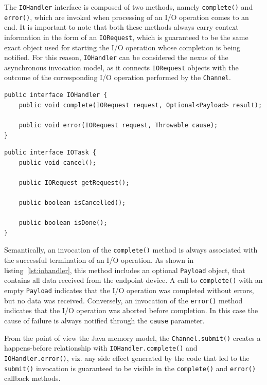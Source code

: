 The \texttt{IOHandler} interface is composed of two methods, namely
\texttt{complete()} and \texttt{error()}, which are invoked when processing of
an I/O operation comes to an end. It is important to note that both these
methods always carry context information in the form of an \texttt{IORequest},
which is guaranteed to be the same exact object used for starting the I/O
operation whose completion is being notified. For this reason,
\texttt{IOHandler} can be considered the nexus of the asynchronous invocation
model, as it connects \texttt{IORequest} objects with the outcome of the
corresponding I/O operation performed by the \texttt{Channel}.

\lstset{language=Java}
\begin{lstlisting}[float,floatplacement=H,caption=The IOHandler
interface,label={lst:iohandler}]
public interface IOHandler {
	public void complete(IORequest request, Optional<Payload> result);
	
	public void error(IORequest request, Throwable cause);
}
\end{lstlisting}

\lstset{language=Java}
\begin{lstlisting}[float,floatplacement=!hbt,caption=The IOTask
interface,label={lst:iotask}]
public interface IOTask {
	public void cancel();
	
	public IORequest getRequest();
	
	public boolean isCancelled();
	
	public boolean isDone();
}
\end{lstlisting}

Semantically, an invocation of the \texttt{complete()} method is always
associated with the successful termination of an I/O operation. As shown in
listing~\ref{lst:iohandler}, this method includes an optional \texttt{Payload}
object, that contains all data received from the endpoint device. A call to
\texttt{complete()} with an empty \texttt{Payload} indicates that the I/O
operation was completed without errors, but no data was received. Conversely,
an invocation of the \texttt{error()} method indicates that the I/O operation
was aborted before completion. In this case the cause of failure is always
notified through the \texttt{cause} parameter.

From the point of view the Java memory model, the \texttt{Channel.submit()}
creates a happens-before relationship with \texttt{IOHandler.complete()} and
\texttt{IOHandler.error()}, viz. any side effect generated by the code that led
to the \texttt{submit()} invocation is guaranteed to be visible in the
\texttt{complete()} and \texttt{error()} callback methods.

